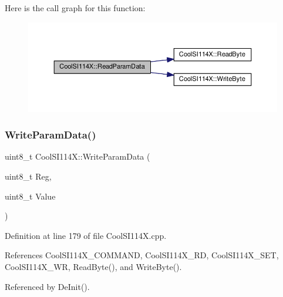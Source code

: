 Here is the call graph for this function\+:
\nopagebreak
\begin{figure}[H]
\begin{center}
\leavevmode
\includegraphics[width=350pt]{dd/d67/class_cool_s_i114_x_a33cf431103c722442f6a0cc93848d640_cgraph}
\end{center}
\end{figure}
\mbox{\label{class_cool_s_i114_x_abf45eb10a6de1be16e68a51624fa2608}} 
\subsubsection{\texorpdfstring{Write\+Param\+Data()}{WriteParamData()}}
{\footnotesize\ttfamily uint8\+\_\+t Cool\+S\+I114\+X\+::\+Write\+Param\+Data (\begin{DoxyParamCaption}\item[{uint8\+\_\+t}]{Reg,  }\item[{uint8\+\_\+t}]{Value }\end{DoxyParamCaption})}



Definition at line 179 of file Cool\+S\+I114\+X.\+cpp.



References Cool\+S\+I114\+X\+\_\+\+C\+O\+M\+M\+A\+ND, Cool\+S\+I114\+X\+\_\+\+RD, Cool\+S\+I114\+X\+\_\+\+S\+ET, Cool\+S\+I114\+X\+\_\+\+WR, Read\+Byte(), and Write\+Byte().



Referenced by De\+Init().


